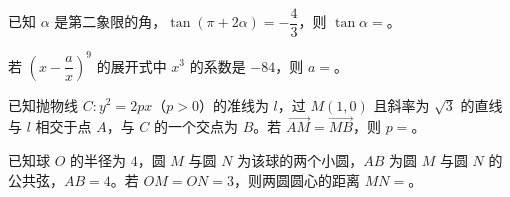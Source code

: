 \begin{question}
已知 $\alpha$ 是第二象限的角，$\tan(\pi+2\alpha)=-\dfrac43$，则 $\tan\alpha=$\gkblank{}。

\end{question}
\begin{question}
若 $\left(x-\dfrac ax\right)^9$ 的展开式中 $x^3$ 的系数是 $-84$，则 $a=$\gkblank{}。

\end{question}
\begin{question}
已知抛物线 $C:y^2=2px$（$p>0$）的准线为 $l$，过 $M(1,0)$ 且斜率为 $\sqrt3$ 的直线与 $l$ 相交于点 $A$，与 $C$ 的一个交点为 $B$。若 $\overrightarrow{AM}=\overrightarrow{MB}$，则 $p=$\gkblank{}。

\end{question}
\begin{question}
已知球 $O$ 的半径为 $4$，圆 $M$ 与圆 $N$ 为该球的两个小圆，$AB$ 为圆 $M$ 与圆 $N$ 的公共弦，$AB=4$。若 $OM=ON=3$，则两圆圆心的距离 $MN=$\gkblank{}。

\end{question}

